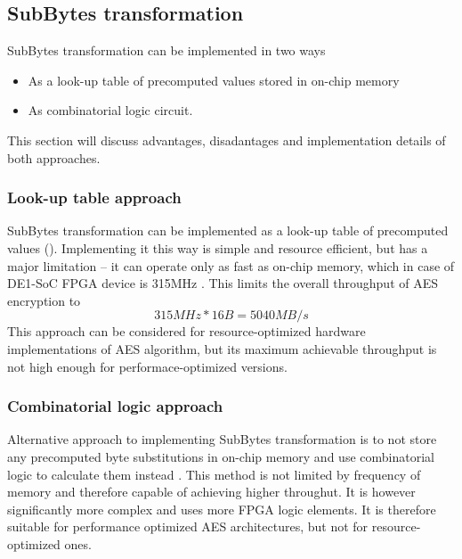 \subsection{SubBytes transformation}
\label{sec:sub-bytes}

SubBytes transformation can be implemented in two ways
\begin{itemize}[nolistsep]
\item As a look-up table of precomputed values stored in on-chip memory
\item As combinatorial logic circuit.
\end{itemize}
This section will discuss advantages, disadantages and implementation details of both approaches.





\subsubsection{Look-up table approach}
SubBytes transformation can be implemented as a look-up table of precomputed values (\cite[Fig. 7]{aes-standard}). Implementing it this way is simple and resource efficient, but has a major limitation -- it can operate only as fast as on-chip memory, which in case of DE1-SoC FPGA device is 315MHz \cite[Table 2-1]{altera-vol1}. This limits the overall throughput of AES encryption to
$$
315MHz * 16B = 5040MB/s
$$
This approach can be considered for resource-optimized hardware implementations of AES algorithm, but its maximum achievable throughput is not high enough for performace-optimized versions.




\subsubsection{Combinatorial logic approach}
\label{sec:comb-theory}
Alternative approach to implementing SubBytes transformation is to not store any precomputed byte substitutions in on-chip memory and use combinatorial logic to calculate them instead \cite{practical-sub-bytes}. This method is not limited by frequency of memory and therefore capable of achieving higher throughut. It is however significantly more complex and uses more FPGA logic elements. It is therefore suitable for performance optimized AES architectures, but not for resource-optimized ones.






